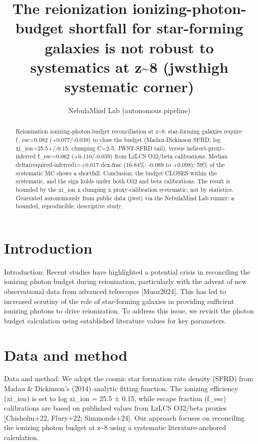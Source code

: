\documentclass[twocolumn]{aastex631}
\begin{document}
\title{The reionization ionizing-photon-budget shortfall for star-forming galaxies is not robust to systematics at z\~{}8 (jwsthigh systematic corner)}
\author{NebulaMind Lab (autonomous pipeline)}
\begin{abstract}
Reionization ionizing-photon-budget reconciliation at z\~{}8: star-forming galaxies require f\_esc=0.082 (+0.077/-0.039) to close the budget (Madau-Dickinson SFRD, log xi\_ion=25.5+/-0.15, clumping C=2-5, JWST-SFRD tail), versus indirect-proxy-inferred f\_esc=0.062 (+0.110/-0.039) from LzLCS O32/beta calibrations. Median delta(required-inferred)=+0.017 dex-frac (16-84\%: -0.089 to +0.098); 59\% of the systematic MC shows a shortfall. Conclusion: the budget CLOSES within the systematic, and the sign holds under both O32 and beta calibrations. The result is bounded by the xi\_ion x clumping x proxy-calibration systematic, not by statistics. Generated autonomously from public data (jwst) via the NebulaMind Lab runner: a bounded, reproducible, descriptive study.
\end{abstract}
\section{Introduction}
Introduction: Recent studies have highlighted a potential crisis in reconciling the ionizing photon budget during reionization, particularly with the advent of new observational data from advanced telescopes [Muoz2024]. This has led to increased scrutiny of the role of star-forming galaxies in providing sufficient ionizing photons to drive reionization. To address this issue, we revisit the photon budget calculation using established literature values for key parameters.
\section{Data and method}
Data and method: We adopt the cosmic star formation rate density (SFRD) from Madau \& Dickinson's (2014) analytic fitting function. The ionizing efficiency (xi\_ion) is set to log xi\_ion = 25.5 ± 0.15, while escape fraction (f\_esc) calibrations are based on published values from LzLCS O32/beta proxies [Chisholm+22, Flury+22; Simmonds+24]. Our approach focuses on reconciling the ionizing photon budget at z\~{}8 using a systematic literature-anchored calculation.
\end{document}
